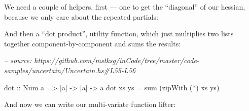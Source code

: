 \documentclass[]{article}
\newenvironment{Shaded}{}{}
\newcommand{\CommentTok}[1]{\textcolor[rgb]{0.38,0.63,0.69}{\textit{#1}}}
\newcommand{\DataTypeTok}[1]{\textcolor[rgb]{0.56,0.13,0.00}{#1}}
\newcommand{\DecValTok}[1]{\textcolor[rgb]{0.25,0.63,0.44}{#1}}
\newcommand{\FunctionTok}[1]{\textcolor[rgb]{0.02,0.16,0.49}{#1}}
\newcommand{\KeywordTok}[1]{\textcolor[rgb]{0.00,0.44,0.13}{\textbf{#1}}}
\newcommand{\NormalTok}[1]{#1}
\newcommand{\OtherTok}[1]{\textcolor[rgb]{0.00,0.44,0.13}{#1}}
\begin{document}
We need a couple of helpers, first --- one to get the ``diagonal'' of our
hessian, because we only care about the repeated partials:

\begin{Shaded}
\end{Shaded}

And then a ``dot product'', utility function, which just multiplies two lists
together component-by-component and sums the results:

\begin{Shaded}
\begin{Highlighting}[]
\CommentTok{-- source: https://github.com/mstksg/inCode/tree/master/code-samples/uncertain/Uncertain.hs#L55-L56}

\OtherTok{dot ::} \DataTypeTok{Num}\NormalTok{ a }\OtherTok{=>}\NormalTok{ [a] }\OtherTok{->}\NormalTok{ [a] }\OtherTok{->}\NormalTok{ a}
\NormalTok{dot xs ys }\FunctionTok{=}\NormalTok{ sum (zipWith (}\FunctionTok{*}\NormalTok{) xs ys)}
\end{Highlighting}
\end{Shaded}

And now we can write our multi-variate function lifter:
\end{document}
